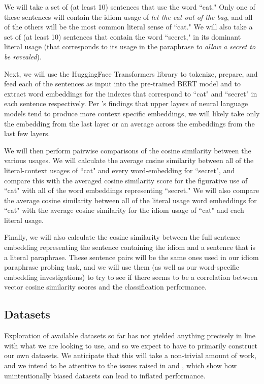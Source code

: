 \documentclass[11pt,a4paper]{article}
\begin{document}
 We will take a set of (at least 10) sentences that use the word ``cat."  Only one of these sentences will contain the idiom usage of \textit{let the cat out of the bag}, and all of the others will be the most common literal sense of ``cat." We will also take a set of (at least 10) sentences that contain the word ``secret," in its dominant literal usage (that corresponds to its usage in the paraphrase \textit{to allow a secret to be revealed}). 
 
 Next, we will use the HuggingFace Transformers library \citep{wolf2019huggingfaces} to tokenize, prepare, and feed each of the sentences as input into the pre-trained BERT model and to extract word embeddings for the indexes that correspond to ``cat" and ``secret" in each sentence respectively. Per \citet{ethayarajh2019contextual}'s findings that upper layers of neural language models tend to produce more context specific embeddings, we will likely take only the embedding from the last layer or an average across the embeddings from the last few layers.
 
 We will then perform pairwise comparisons of the cosine similarity between the various usages. We will calculate the average cosine similarity between all of the literal-context usages of ``cat" and every word-embedding for ``secret", and compare this with the averaged cosine similarity score for the figurative use of ``cat" with all of the  word embeddings representing ``secret." We will also compare the average cosine similarity between all of the literal usage word embeddings for ``cat" with the average cosine similarity for the idiom usage of ``cat" and each literal usage.
 
 Finally, we will also calculate the cosine similarity between the full sentence embedding representing the sentence containing the idiom and a sentence that is a literal paraphrase. These sentence pairs will be the same ones used in our idiom paraphrase probing task, and we will use them (as well as our word-specific embedding investigations) to try to see if there seems to be a correlation between vector cosine similarity scores and the classification performance.

\subsection{Datasets}
Exploration of available datasets so far has not yielded anything precisely in line with what we are looking to use, and so we expect to have to primarily construct our own datasets. We anticipate that this will take a non-trivial amount of work, and we intend to be attentive to the issues raised in \citet{niven2019probing} and \citet{mccoy2019right}, which show how unintentionally biased datasets can lead to inflated performance.
\end{document}
